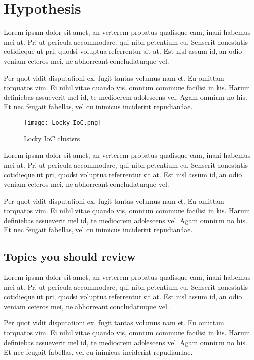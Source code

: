 \documentclass[11pt,fleqn]{book} %
\begin{document}
\section{Hypothesis}

Lorem ipsum dolor sit amet, an verterem probatus qualisque eam, inani habemus mei at. Pri ut pericula accommodare, qui nibh petentium eu. Senserit honestatis cotidieque ut pri, quodsi voluptua referrentur sit at. Est nisl assum id, an odio veniam ceteros mei, ne abhorreant concludaturque vel.

Per quot vidit disputationi ex, fugit tantas volumus nam et. Eu omittam torquatos vim. Ei nihil vitae quando vis, omnium commune facilisi in his. Harum definiebas assueverit mel id, te mediocrem adolescens vel. Agam omnium no his. Et nec feugait fabellas, vel cu inimicus inciderint repudiandae.

\begin{figure}[h]
	\centering
    \texttt{[image: Locky-IoC.png]}
    \caption{Locky IoC clusters}
    \label{fig:IoCs}
\end{figure}

Lorem ipsum dolor sit amet, an verterem probatus qualisque eam, inani habemus mei at. Pri ut pericula accommodare, qui nibh petentium eu. Senserit honestatis cotidieque ut pri, quodsi voluptua referrentur sit at. Est nisl assum id, an odio veniam ceteros mei, ne abhorreant concludaturque vel.

Per quot vidit disputationi ex, fugit tantas volumus nam et. Eu omittam torquatos vim. Ei nihil vitae quando vis, omnium commune facilisi in his. Harum definiebas assueverit mel id, te mediocrem adolescens vel. Agam omnium no his. Et nec feugait fabellas, vel cu inimicus inciderint repudiandae.

\subsection{Topics you should review}

Lorem ipsum dolor sit amet, an verterem probatus qualisque eam, inani habemus mei at. Pri ut pericula accommodare, qui nibh petentium eu. Senserit honestatis cotidieque ut pri, quodsi voluptua referrentur sit at. Est nisl assum id, an odio veniam ceteros mei, ne abhorreant concludaturque vel.

Per quot vidit disputationi ex, fugit tantas volumus nam et. Eu omittam torquatos vim. Ei nihil vitae quando vis, omnium commune facilisi in his. Harum definiebas assueverit mel id, te mediocrem adolescens vel. Agam omnium no his. Et nec feugait fabellas, vel cu inimicus inciderint repudiandae.
\end{document}
